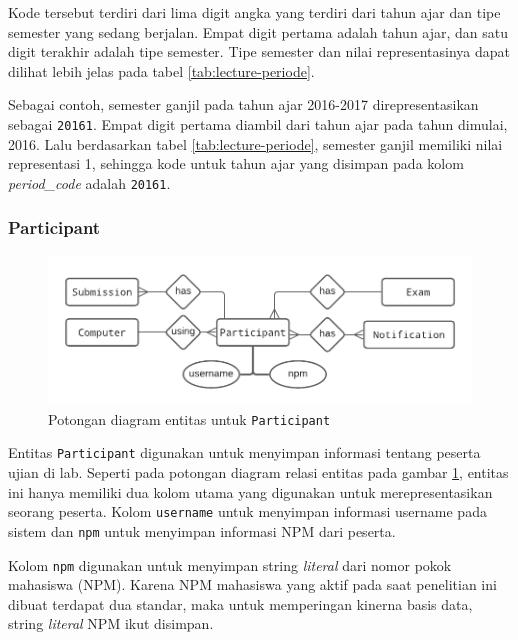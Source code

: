     Kode tersebut terdiri dari lima digit angka yang terdiri dari tahun ajar dan
    tipe semester yang sedang berjalan. Empat digit pertama adalah tahun ajar,
    dan satu digit terakhir adalah tipe semester. Tipe semester dan nilai
    representasinya dapat dilihat lebih jelas pada tabel
    \ref{tab:lecture-periode}.
    
    Sebagai contoh, semester ganjil pada tahun ajar 2016-2017 direpresentasikan
    sebagai \texttt{20161}. Empat digit pertama diambil dari tahun ajar pada
    tahun dimulai, 2016. Lalu berdasarkan tabel \ref{tab:lecture-periode},
    semester ganjil memiliki nilai representasi 1, sehingga kode untuk tahun
    ajar yang disimpan pada kolom \textit{period\_code} adalah \texttt{20161}.
    
\subsubsection{Participant}
    \begin{figure}
        \centering
        \includegraphics{Gambar/erd-details/ERD--New - Participant.pdf}
        \caption{Potongan diagram entitas untuk \texttt{Participant}}
        \label{fig:erd_participant}
    \end{figure}
    
    Entitas \texttt{Participant} digunakan untuk menyimpan informasi tentang
    peserta ujian di lab. Seperti pada potongan diagram relasi entitas pada
    gambar \ref{fig:erd_participant}, entitas ini hanya memiliki dua kolom utama
    yang digunakan untuk merepresentasikan seorang peserta. Kolom
    \texttt{username} untuk menyimpan informasi username pada sistem dan
    \texttt{npm} untuk menyimpan informasi NPM dari peserta.
    
    Kolom \texttt{npm} digunakan untuk menyimpan string \textit{literal} dari
    nomor pokok mahasiswa (NPM). Karena NPM mahasiswa yang aktif pada saat
    penelitian ini dibuat terdapat dua standar, maka untuk memperingan kinerna
    basis data, string \textit{literal} NPM ikut disimpan.
    
